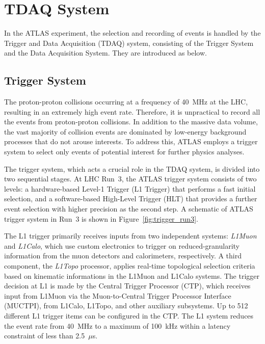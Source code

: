 \section{TDAQ System} \label{sec:TDAQSystem}
In the ATLAS experiment, the selection and recording of events is handled by the Trigger and Data Acquisition (TDAQ) system, consisting of the Trigger System and the Data Acquisition System. They are introduced as below.
\subsection{Trigger System}
The proton-proton collisions occurring at a frequency of 40~MHz at the LHC, resulting in an extremely high event rate. Therefore, it is unpractical to record all the events from proton-proton collisions. In addition to the massive data volume, the vast majority of collision events are dominated by low-energy background processes that do not arouse interests. To address this, ATLAS employs a trigger system to select only events of potential interest for further physics analyses.

The trigger system, which acts a crucial role in the TDAQ system, is divided into two sequential stages. At LHC Run~3, the ATLAS trigger system consists of two levels: a hardware-based Level-1 Trigger (L1 Trigger) that performs a fast initial selection, and a software-based High-Level Trigger (HLT) that provides a further event selection with higher precision as the second step. A schematic of ATLAS trigger system in Run~3 is shown in Figure~\ref{fig:trigger_run3}.

The L1 trigger primarily receives inputs from two independent systems: \textit{L1Muon} and \textit{L1Calo}, which use custom electronics to trigger on reduced-granularity information from the muon detectors and calorimeters, respectively. A third component, the \textit{L1Topo} processor, applies real-time topological selection criteria based on kinematic informations in the L1Muon and L1Calo systems. The trigger decision at L1 is made by the Central Trigger Processor (CTP), which receives input from L1Muon via the Muon-to-Central Trigger Processor Interface (MUCTPI), from L1Calo, L1Topo, and other auxiliary subsystems. Up to 512 different L1 trigger items can be configured in the CTP. The L1 system reduces the event rate from 40~MHz to a maximum of 100~kHz within a latency constraint of less than 2.5~$\mu$s. 

